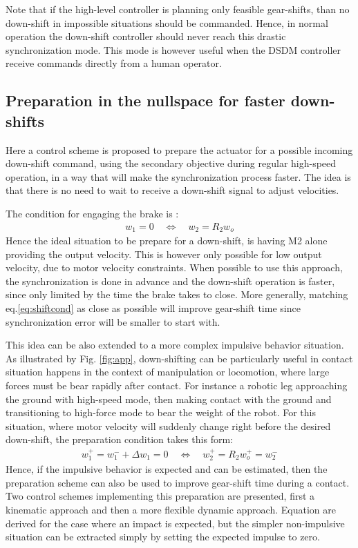 Note that if the high-level controller is planning only feasible gear-shifts, than no down-shift in impossible situations should be commanded. Hence, in normal operation the down-shift controller should never reach this drastic synchronization mode. This mode is however useful when the DSDM controller receive commands directly from a human operator.

\subsection{Preparation in the nullspace for faster down-shifts}
\label{sec:prep}

Here a control scheme is proposed to prepare the actuator for a possible incoming down-shift command, using the secondary objective during regular high-speed operation, in a way that will make the synchronization process faster. The idea is that there is no need to wait to receive a down-shift signal to adjust velocities. 

The condition for engaging the brake is :
%
\begin{align}
w_1 = 0 \quad \Leftrightarrow \quad w_2 = R_2 w_o
\label{eq:shiftcond}
\end{align}
%
Hence the ideal situation to be prepare for a down-shift, is having M2 alone providing the output velocity. This is however only possible for low output velocity, due to motor velocity constraints. When possible to use this approach, the synchronization is done in advance and the down-shift operation is faster, since only limited by the time the brake takes to close. More generally, matching eq.\eqref{eq:shiftcond} as close as possible will improve gear-shift time since synchronization error will be smaller to start with.

This idea can be also extended to a more complex impulsive behavior situation. As illustrated by Fig. \ref{fig:app}, down-shifting can be particularly useful in contact situation happens in the context of manipulation or locomotion, where large forces must be bear rapidly after contact. For instance a robotic leg approaching the ground with high-speed mode, then making contact with the ground and transitioning to high-force mode to bear the weight of the robot. For this situation, where motor velocity will suddenly change right before the desired down-shift, the preparation condition takes this form:
%
\begin{align}
w_1^+ = w_1^- + \Delta w_1 = 0 \quad \Leftrightarrow \quad w_2^+ = R_2 w_o^+ = w_2^- 
\end{align}
%
Hence, if the impulsive behavior is expected and can be estimated, then the preparation scheme can also be used to improve gear-shift time during a contact. Two control schemes implementing this preparation are presented, first a kinematic approach and then a more flexible dynamic approach. Equation are derived for the case where an impact is expected, but the simpler non-impulsive situation can be extracted simply by setting the expected impulse to zero.

